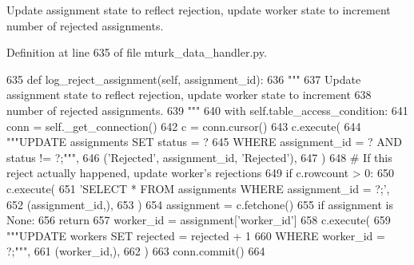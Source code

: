 \begin{DoxyVerb}Update assignment state to reflect rejection, update worker state to increment
number of rejected assignments.
\end{DoxyVerb}
 

Definition at line 635 of file mturk\+\_\+data\+\_\+handler.\+py.


\begin{DoxyCode}
635     \textcolor{keyword}{def }log\_reject\_assignment(self, assignment\_id):
636         \textcolor{stringliteral}{"""}
637 \textcolor{stringliteral}{        Update assignment state to reflect rejection, update worker state to increment}
638 \textcolor{stringliteral}{        number of rejected assignments.}
639 \textcolor{stringliteral}{        """}
640         with self.table\_access\_condition:
641             conn = self.\_get\_connection()
642             c = conn.cursor()
643             c.execute(
644                 \textcolor{stringliteral}{"""UPDATE assignments SET status = ?}
645 \textcolor{stringliteral}{                         WHERE assignment\_id = ? AND status != ?;"""},
646                 (\textcolor{stringliteral}{'Rejected'}, assignment\_id, \textcolor{stringliteral}{'Rejected'}),
647             )
648             \textcolor{comment}{# If this reject actually happened, update worker's rejections}
649             \textcolor{keywordflow}{if} c.rowcount > 0:
650                 c.execute(
651                     \textcolor{stringliteral}{'SELECT * FROM assignments WHERE assignment\_id = ?;'},
652                     (assignment\_id,),
653                 )
654                 assignment = c.fetchone()
655                 \textcolor{keywordflow}{if} assignment \textcolor{keywordflow}{is} \textcolor{keywordtype}{None}:
656                     \textcolor{keywordflow}{return}
657                 worker\_id = assignment[\textcolor{stringliteral}{'worker\_id'}]
658                 c.execute(
659                     \textcolor{stringliteral}{"""UPDATE workers SET rejected = rejected + 1}
660 \textcolor{stringliteral}{                             WHERE worker\_id = ?;"""},
661                     (worker\_id,),
662                 )
663             conn.commit()
664 
\end{DoxyCode}
\mbox{\label{classparlai_1_1mturk_1_1core_1_1dev_1_1mturk__data__handler_1_1MTurkDataHandler_aa084ae52cbcc1fdce7e5a20f079f3f47}} 
